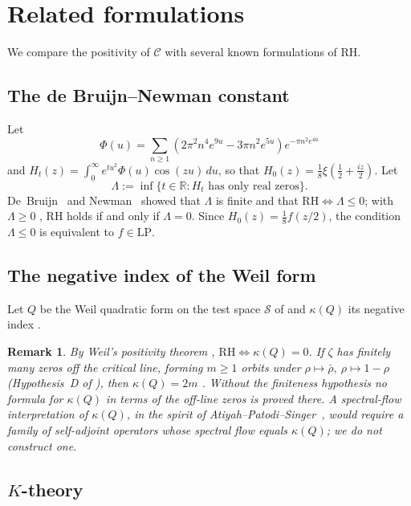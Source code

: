 \documentclass[11pt]{amsart}
\newtheorem{remark}[theorem]{Remark}
\newcommand{\LP}{\mathrm{LP}}
\begin{document}
\section{Related formulations}
\label{sec:fronts}

We compare the positivity of $\mathcal C$ with several known formulations of RH.

\subsection{The de Bruijn--Newman constant}

Let
\[
  \Phi(u)=\sum_{n\ge1}(2\pi^2n^4e^{9u}-3\pi n^2e^{5u})e^{-\pi n^2e^{4u}}
\]
and $H_t(z)=\int_0^\infty e^{tu^2}\Phi(u)\cos(zu)\,du$, so that
$H_0(z)=\tfrac18\xi(\tfrac12+\tfrac{iz}{2})$. Let
\[
  \Lambda := \inf\{t \in \mathbb{R} : H_t \text{ has only real zeros}\}.
\]
De~Bruijn~\cite{deBruijn1950} and Newman~\cite{Newman1976} showed that $\Lambda$ is finite
and that $\mathrm{RH}\iff\Lambda\le0$; with $\Lambda\ge0$ \cite{RodgersTao2020}, RH holds if
and only if $\Lambda=0$. Since $H_0(z)=\tfrac18 f(z/2)$, the condition $\Lambda\le 0$ is
equivalent to $f\in\LP$.

\subsection{The negative index of the Weil form}

Let $Q$ be the Weil quadratic form on the test space $\mathcal S$ of \cite[Def.~2.1]{P25}
and $\kappa(Q)$ its negative index \cite[Def.~2.3]{P25}.

\begin{remark}\label{rem:kappa}
By Weil's positivity theorem \cite[Thm.~2.2]{P25}, $\mathrm{RH}\iff\kappa(Q)=0$. If $\zeta$
has finitely many zeros off the critical line, forming $m\ge1$ orbits under
$\rho\mapsto\bar\rho,\ \rho\mapsto1-\rho$ (Hypothesis~D of \cite[Def.~2.4]{P25}), then
$\kappa(Q)=2m$ \cite[Prop.~4.7]{P25}. Without the finiteness hypothesis no formula for
$\kappa(Q)$ in terms of the off-line zeros is proved there. A spectral-flow interpretation of
$\kappa(Q)$, in the spirit of Atiyah--Patodi--Singer~\cite{APS1975}, would require a family
of self-adjoint operators whose spectral flow equals $\kappa(Q)$; we do not construct one.
\end{remark}

\subsection{\texorpdfstring{$K$}{K}-theory}
\end{document}
